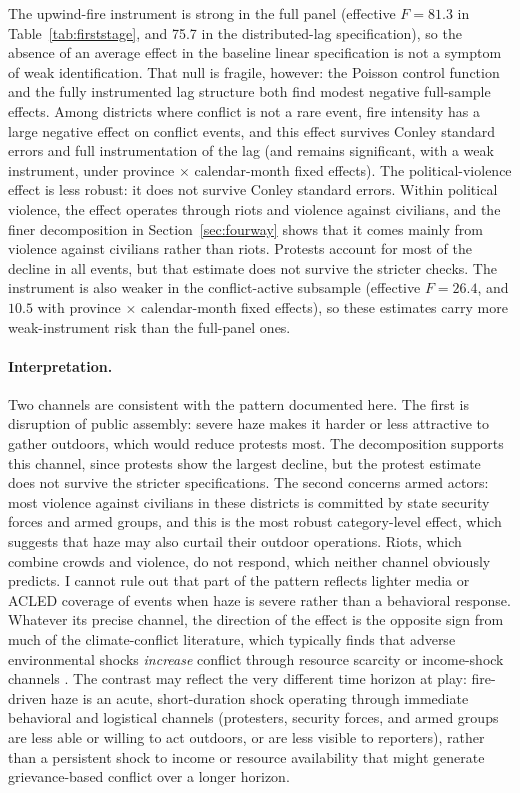 \documentclass[12pt]{article}
\begin{document}
The upwind-fire instrument is strong in the full panel (effective $F = 81.3$ in Table~\ref{tab:firststage}, and 75.7 in the distributed-lag specification), so the absence of an average effect in the baseline linear specification is not a symptom of weak identification. That null is fragile, however: the Poisson control function and the fully instrumented lag structure both find modest negative full-sample effects. Among districts where conflict is not a rare event, fire intensity has a large negative effect on conflict events, and this effect survives Conley standard errors and full instrumentation of the lag (and remains significant, with a weak instrument, under province $\times$ calendar-month fixed effects). The political-violence effect is less robust: it does not survive Conley standard errors. Within political violence, the effect operates through riots and violence against civilians, and the finer decomposition in Section~\ref{sec:fourway} shows that it comes mainly from violence against civilians rather than riots. Protests account for most of the decline in all events, but that estimate does not survive the stricter checks. The instrument is also weaker in the conflict-active subsample (effective $F = 26.4$, and $10.5$ with province $\times$ calendar-month fixed effects), so these estimates carry more weak-instrument risk than the full-panel ones.

\paragraph{Interpretation.} Two channels are consistent with the pattern documented here. The first is disruption of public assembly: severe haze makes it harder or less attractive to gather outdoors, which would reduce protests most. The decomposition supports this channel, since protests show the largest decline, but the protest estimate does not survive the stricter specifications. The second concerns armed actors: most violence against civilians in these districts is committed by state security forces and armed groups, and this is the most robust category-level effect, which suggests that haze may also curtail their outdoor operations. Riots, which combine crowds and violence, do not respond, which neither channel obviously predicts. I cannot rule out that part of the pattern reflects lighter media or ACLED coverage of events when haze is severe rather than a behavioral response. Whatever its precise channel, the direction of the effect is the opposite sign from much of the climate-conflict literature, which typically finds that adverse environmental shocks \emph{increase} conflict through resource scarcity or income-shock channels \citep{hsiang2013quantifying,burkehsiangmiguel2015,miguelsatyanathsergenti2004}. The contrast may reflect the very different time horizon at play: fire-driven haze is an acute, short-duration shock operating through immediate behavioral and logistical channels (protesters, security forces, and armed groups are less able or willing to act outdoors, or are less visible to reporters), rather than a persistent shock to income or resource availability that might generate grievance-based conflict over a longer horizon.
\end{document}
